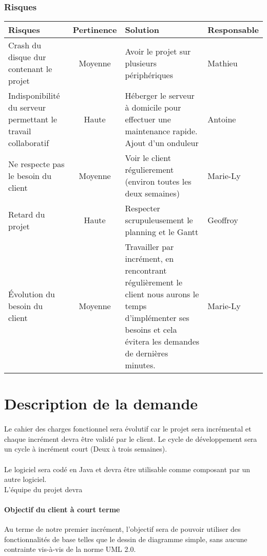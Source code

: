 \documentclass[12pt,a4paper,openany]{article}
\begin{document}
		\subsubsection{Risques}
		\begin{center}
		\begin{tabular}{|p{5.5cm}|c|p{6.5cm}|p{2.5cm}|}
				\hline
				\textbf{Risques} & \textbf{Pertinence} & \textbf{Solution} & \textbf{Responsable} \\
				\hline
				Crash du disque dur contenant le projet & Moyenne & Avoir le projet sur plusieurs périphériques & Mathieu\\
				\hline
				Indisponibilité du serveur permettant le travail collaboratif & Haute& Héberger le serveur à domicile pour effectuer une maintenance rapide. 
				Ajout d'un onduleur & Antoine  \\
				\hline
				Ne respecte pas le besoin du client & Moyenne & Voir le client régulierement (environ toutes les deux semaines) & Marie-Ly\\ 
				\hline
				Retard du projet & Haute & Respecter scrupuleusement le planning et le Gantt & Geoffroy\\
				\hline
				Évolution du besoin du client & Moyenne &  Travailler par incrément, en rencontrant régulièrement le client  nous aurons le temps d'implémenter ses besoins et cela évitera les demandes de dernières minutes. & Marie-Ly \\ 
				\hline
			\end{tabular}
		\end{center}	
	\section{Description de la demande}
	\paragraph{}
		Le cahier des charges fonctionnel sera évolutif car le projet sera incrémental et chaque incrément devra 
		être validé par le client. Le cycle de développement sera un cycle à incrément court (Deux à trois semaines).
	\paragraph{}
		Le logiciel sera codé en Java et devra être utilisable comme composant par un autre logiciel.\\
		L'équipe du projet devra 
	\paragraph{Objectif du client à court terme} Au terme de notre premier incrément, l'objectif sera
	de pouvoir utiliser des fonctionnalités de base telles que le dessin de diagramme simple, sans aucune
	contrainte vis-à-vis de la norme UML 2.0.
\end{document}
